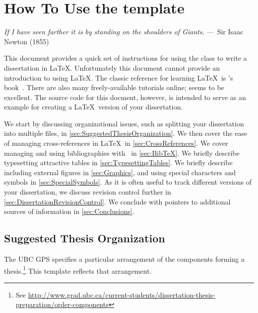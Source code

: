 
\chapter{How To Use the template}
\label{ch:HowTo}

\begin{epigraph}
    \emph{If I have seen farther it is by standing on the shoulders of
    Giants.} ---~Sir Isaac Newton (1855)
\end{epigraph}

This document provides a quick set of instructions for using the
 class to write a dissertation in \LaTeX. 
Unfortunately this document cannot provide an introduction to using
\LaTeX.  The classic reference for learning \LaTeX\ is
\citeauthor{lamport-1994-ladps}'s
book~\cite{lamport-1994-ladps}.  There are also many freely-available
tutorials online;
seems to be excellent.
The source code for this docment, however, is intended to serve as
an example for creating a \LaTeX\ version of your dissertation.

We start by discussing organizational issues, such as splitting
your dissertation into multiple files, in
\autoref{sec:SuggestedThesisOrganization}.
We then cover the ease of managing cross-references in \LaTeX\ in
\autoref{sec:CrossReferences}.
We cover managing and using bibliographies with \BibTeX\ in
\autoref{sec:BibTeX}. 
We briefly describe typesetting attractive tables in
\autoref{sec:TypesettingTables}.
We briefly describe including external figures in
\autoref{sec:Graphics}, and using special characters and symbols
in \autoref{sec:SpecialSymbols}.
As it is often useful to track different versions of your dissertation,
we discuss revision control further in
\autoref{sec:DissertationRevisionControl}. 
We conclude with pointers to additional sources of information in
\autoref{sec:Conclusions}.

\section{Suggested Thesis Organization}
\label{sec:SuggestedThesisOrganization}

The \acs{UBC} \acf{GPS} specifies a particular arrangement of the
components forming a thesis.\footnote{See
    \url{http://www.grad.ubc.ca/current-students/dissertation-thesis-preparation/order-components}}
This template reflects that arrangement.

